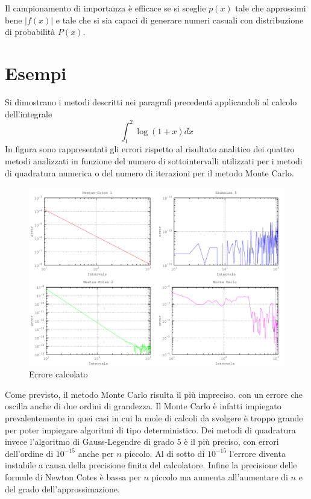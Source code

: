 Il campionamento di importanza è efficace se si sceglie $p(x)$ tale che approssimi bene $|f(x)|$ e tale che si sia capaci di generare numeri casuali con distribuzione di probabilità $P(x)$.

\section{Esempi}
Si dimostrano i metodi descritti nei paragrafi precedenti applicandoli al calcolo dell'integrale $$\int_1^2\log(1+x)dx$$
In figura sono rappresentati gli errori rispetto al risultato analitico dei quattro metodi analizzati in funzione del numero di sottointervalli utilizzati per i metodi di quadratura numerica o del numero di iterazioni per il metodo Monte Carlo.
\begin{figure}[H]
\centering
\includegraphics[width=\textwidth]{integral}
\caption{Errore calcolato}
\label{fig:integral}
\end{figure}

Come previsto, il metodo Monte Carlo risulta il più impreciso. con un errore che oscilla anche di due ordini di grandezza. Il Monte Carlo è infatti impiegato prevalentemente in quei casi in cui la mole di calcoli da svolgere è troppo grande per poter impiegare algoritmi di tipo deterministico.
Dei metodi di quadratura invece l'algoritmo di Gauss-Legendre di grado $5$ è il più preciso, con errori dell'ordine di $10^{-15}$ anche per $n$ piccolo. Al di sotto di $10^{-15}$ l'errore diventa instabile a causa della precisione finita del calcolatore. Infine la precisione delle formule di Newton Cotes è bassa per $n$ piccolo ma aumenta all'aumentare di $n$ e del grado dell'approssimazione.
